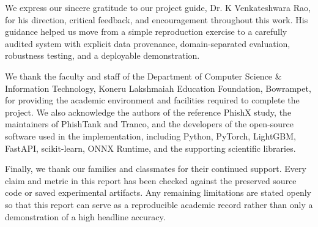 We express our sincere gratitude to our project guide, Dr. K Venkateshwara
Rao, for his direction, critical feedback, and encouragement throughout this
work. His guidance helped us move from a simple reproduction exercise to a
carefully audited system with explicit data provenance, domain-separated
evaluation, robustness testing, and a deployable demonstration.

We thank the faculty and staff of the Department of Computer Science \&
Information Technology, Koneru Lakshmaiah Education Foundation, Bowrampet,
for providing the academic environment and facilities required to complete
the project. We also acknowledge the authors of the reference PhishX study,
the maintainers of PhishTank and Tranco, and the developers of the open-source
software used in the implementation, including Python, PyTorch, LightGBM,
FastAPI, scikit-learn, ONNX Runtime, and the supporting scientific libraries.

Finally, we thank our families and classmates for their continued support.
Every claim and metric in this report has been checked against the preserved
source code or saved experimental artifacts. Any remaining limitations are
stated openly so that this report can serve as a reproducible academic record
rather than only a demonstration of a high headline accuracy.
